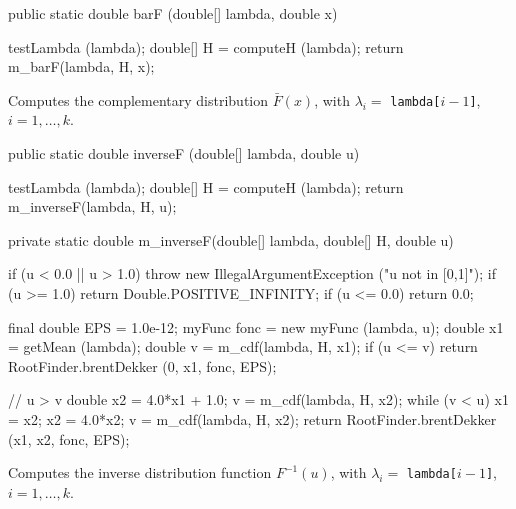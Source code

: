 \begin{code}

   public static double barF (double[] lambda, double x)\begin{hide} {
      testLambda (lambda);
      double[] H = computeH (lambda);
      return m_barF(lambda, H, x);
   }\end{hide}
\end{code}
\begin{tabb}
  Computes the complementary distribution $\bar F(x)$,
with $\lambda_i = $ \texttt{lambda[$i-1$]}, $i = 1,\ldots,k$.
 \end{tabb}
\begin{htmlonly}
\end{htmlonly}
\begin{code}

   public static double inverseF (double[] lambda, double u)\begin{hide} {
      testLambda (lambda);
      double[] H = computeH (lambda);
      return m_inverseF(lambda, H, u);
   }

   private static double m_inverseF(double[] lambda, double[] H, double u) {
      if (u < 0.0 || u > 1.0)
          throw new IllegalArgumentException ("u not in [0,1]");
      if (u >= 1.0)
          return Double.POSITIVE_INFINITY;
      if (u <= 0.0)
          return 0.0;

      final double EPS = 1.0e-12;
      myFunc fonc = new myFunc (lambda, u);
      double x1 = getMean (lambda);
      double v = m_cdf(lambda, H, x1);
      if (u <= v)
         return RootFinder.brentDekker (0, x1, fonc, EPS);

      // u > v
      double x2 = 4.0*x1 + 1.0;
      v = m_cdf(lambda, H, x2);
      while (v < u) {
         x1 = x2;
         x2 = 4.0*x2;
         v = m_cdf(lambda, H, x2);
      }
      return RootFinder.brentDekker (x1, x2, fonc, EPS);
   }\end{hide}
\end{code}
\begin{tabb} Computes the inverse distribution function $F^{-1}(u)$,
with $\lambda_i = $ \texttt{lambda[$i-1$]}, $i = 1,\ldots,k$.
\end{tabb}
\begin{htmlonly}
\end{htmlonly}
